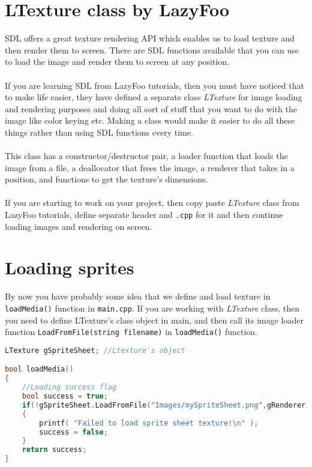 \documentclass[11pt,fleqn]{book} %
\begin{document}
    \section{LTexture class by LazyFoo}
    SDL offers a great texture rendering API which enables us to load texture and then render them to screen. There are SDL functions available that you can use to load the image and render them to screen at any position. \\  \\
    If you are learning SDL from LazyFoo tutorials, then you must have noticed that to make life easier, they have defined a separate class \textit{LTexture} for image loading and rendering purposes and doing all sort of stuff that you want to do with the image like color keying etc. Making a class would make it easier to do all these things rather than using SDL functions every time. \\    \\
    This class has a constructor/destructor pair, a loader function that loads the image from a file, a deallocator that frees the image, a renderer that takes in a position, and functions to get the texture's dimensions. \\   \\
    If you are starting to work on your project, then copy paste \textit{LTexture} class from LazyFoo tutorials, define separate header and \texttt{.cpp} for it and then continue loading images and rendering on screen. 
    \section{Loading sprites}
    By now you have probably some idea that we define and load texture in \texttt{loadMedia()} function in \texttt{main.cpp}. If you are working with \textit{LTexture} class, then you need to define LTexture's class object in main, and then call its image loader function \texttt{LoadFromFile(string filename)} in  \texttt{loadMedia()}  function. \\
    \pagebreak
    \begin{lstlisting}[language=C++, caption=Using LTexture to load images]
LTexture gSpriteSheet; //Ltexture's object

bool loadMedia()
{
	//Loading success flag
	bool success = true;
	if(!gSpriteSheet.LoadFromFile("Images/mySpriteSheet.png",gRenderer))
	{
		printf( "Failed to load sprite sheet texture!\n" );
		success = false;
	}
    return success;
}

\end{lstlisting}
\end{document}
